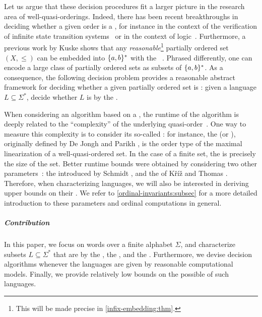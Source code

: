 \AP Let us argue that these decision procedures fit a larger picture in the
research area of well-quasi-orderings.
Indeed, there has been recent breakthroughs in deciding whether a given order
is a , for instance in the context of the verification of
infinite state transition systems~\cite{DBLP:conf/fsttcs/FinkelG19} or in the
context of logic~\cite{DBLP:journals/pacmpl/BergstrasserGLZ24}.
Furthermore, a previous work by Kuske shows that any
\emph{reasonable}\footnote{ This will be made precise in
\cref{infix-embedding:thm}. } partially ordered set $(X, \leq)$ can
be embedded into $\{ a,b \}^*$ with the ~\cite[Lemma
5.1]{DBLP:journals/ita/Kuske06}. Phrased differently, one can encode a large
class of partially ordered sets as subsets of $\{ a,b \}^*$. As a consequence,
the following decision problem provides a reasonable abstract framework for
deciding whether a given partially ordered set is :
given a language $L \subseteq \Sigma^*$, decide whether $L$ is
 by the .

\AP When considering an algorithm based on a , the
runtime of the algorithm is deeply related to the ``complexity'' of the
underlying quasi-order~\cite{SCHMITZ17}. One way to measure this complexity is
to consider its so-called : for instance, the
 (or ), originally defined by De Jongh and Parikh
\cite{dejongh77}, is the order type of the maximal linearization of a
well-quasi-ordered set. In the case of a finite set, the  is precisely
the size of the set. Better runtime bounds were obtained by considering two
other parameters~\cite{SCHMITZ19}: the  introduced by
Schmidt \cite{schmidt81}, and the  of Kříž and Thomas
\cite{kriz90b}. Therefore, when characterizing 
languages, we will also be interested in deriving upper bounds on their
. We refer to \cref{ordinal-invariants:subsec} for a
more detailed introduction to these parameters and ordinal computations in
general.

\subparagraph{Contribution} In this paper, we focus on words over a finite
alphabet $\Sigma$, and characterize subsets $L \subseteq \Sigma^*$ that are
 by the , the ,
and the . Furthermore, we devise decision algorithms
whenever the languages are given by reasonable computational models. Finally,
we provide relatively low bounds on the possible  of
such languages.


